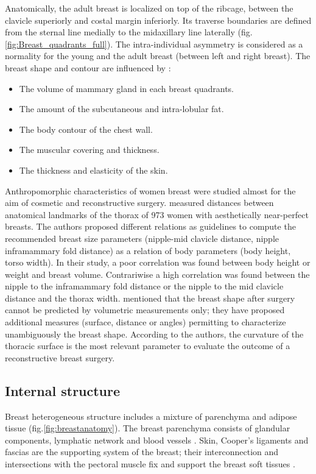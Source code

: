  Anatomically, the adult breast is localized on top of the ribcage, between the clavicle superiorly and costal margin inferiorly. Its traverse boundaries are defined from the sternal line medially to the midaxillary line laterally (fig.\ref{fig:Breast_quadrants_full}). The intra-individual asymmetry is considered as a normality for the young and the adult breast (between left and right breast). The breast shape and contour are influenced by \citep{mugea2014aesthetic}:
 \begin{itemize}
 \item The volume of mammary gland in each breast quadrants.
 \item The amount of the subcutaneous and intra-lobular fat.
 \item The body contour of the chest wall.
 \item The muscular covering and thickness.
 \item The thickness and elasticity of the skin.
 \end{itemize}

Anthropomorphic characteristics of women breast were studied almost for the aim of cosmetic and reconstructive surgery.  \cite{vandeput2002considerations} measured distances between anatomical landmarks of the thorax of 973 women with aesthetically near-perfect breasts. The authors proposed different relations as guidelines to compute the recommended breast size parameters (nipple-mid clavicle distance, nipple inframammary fold distance) as a relation of body parameters (body height, torso width). In their study, a poor correlation was found between body height or weight and breast volume. Contrariwise a high correlation was found between the nipple to the inframammary fold distance or the nipple to the mid clavicle distance and the thorax width. \cite{catanuto2008experimental} mentioned that the breast shape after surgery cannot be predicted by volumetric measurements only; they have proposed additional measures (surface, distance or angles) permitting to characterize unambiguously the breast shape. According to the authors, the curvature of the thoracic surface is the most relevant parameter to evaluate the outcome of a reconstructive breast surgery.


\subsection{Internal structure}\label{subsection:internalstructures}

Breast heterogeneous structure includes a mixture of parenchyma and adipose tissue (fig.\ref{fig:breastanatomy}). The breast parenchyma consists of glandular components, lymphatic network and blood vessels \citep{clemente2011anatomy}. Skin, Cooper's ligaments and fascias are the supporting system of the breast; their interconnection and intersections with the pectoral muscle fix and support the breast soft tissues \citep{mugea2014aesthetic}.

